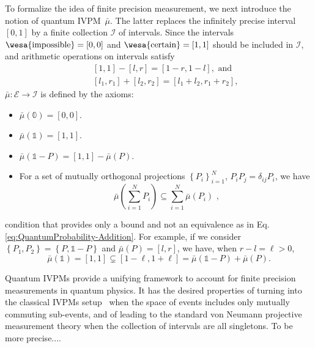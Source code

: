 \documentclass[english,reprint, aps, prl,superscriptaddress, showpacs,
showkeys, longbibliography]{revtex4-1}
\theoremstyle{plain}
\theoremstyle{definition}
\newcommand{\events}{\ensuremath{\mathcal{E}}}
\newcommand{\imposs}{{\mbox{\wesa{impossible}}}}
\newcommand{\necess}{{\mbox{\wesa{certain}}}}
\begin{document}
To formalize the idea of finite precision measurement, we next introduce 
the notion of quantum IVPM~$\bar{\mu}$. The latter replaces 
the infinitely precise interval $[0,1]$ by a finite collection $\mathscr{I}$ of
intervals. Since the intervals $\imposs=\left[0,0\right]$ and $\necess=\left[1,1\right]$ 
should be included in $\mathscr{I}$, and arithmetic operations on intervals satisfy
\begin{subequations}\label{eq:interval-operations}
\begin{eqnarray}
 &  & \left[1,1\right]-\left[l,r\right]=\left[1-r,1-l\right], \textrm{ and}\\
 &  & [l_{1},r_{1}]+[l_{2},r_{2}]=[l_{1}+l_{2},r_{1}+r_{2}] ,
\end{eqnarray}
\end{subequations}
$\bar{\mu}:\events\rightarrow\mathscr{I}$ is defined by the axioms:
\begin{itemize}
\item $\bar{\mu}(\mathbb{0})=\left[0,0\right]$. 
\item $\bar{\mu}(\mathbb{1})=\left[1,1\right]$. 
\item $\bar{\mu}\left(\mathbb{1}-P\right)=\left[1,1\right]-\bar{\mu}\left(P\right)$. 
\item For a set of mutually orthogonal projections $\left\{ P_{i}\right\} _{i=1}^{N}$,
$P_{i}P_{j}=\delta_{ij}P_{i}$, we have 
\begin{equation}
\bar{\mu}\left(\sum_{i=1}^{N}P_{i}\right)\subseteq\sum_{i=1}^{N}\bar{\mu}\left(P_{i}\right)\textrm{ ,}\label{eq:QuantumInterval-valuedProbability-Inclusion}
\end{equation}
\end{itemize}
condition that provides only a bound and not an equivalence as in Eq. 
\eqref{eq:QuantumProbability-Addition}. For
example, if we consider $\left\{ P_{1},P_{2}\right\} =\left\{ P,\mathbb{1}-P\right\} $
and $\bar{\mu}\left(P\right)=\left[l,r\right]$, we have, when $r-l=\ell>0$,
\[
\bar{\mu}(\mathbb{1})=\left[1,1\right]\subsetneq\left[1-\ell,1+\ell\right]=
\bar{\mu}\left(\mathbb{1}-P\right)+\bar{\mu}\left(P\right) .
\]

Quantum IVPMs provide a unifying framework to account for 
finite precision measurements in quantum physics. It has the desired 
properties of turning into the classical IVPMs setup~\cite{JamisonLodwick2004}
when the space of events includes only mutually commuting sub-events, and 
of leading to the standard von Neumann projective measurement theory when 
the collection of intervals are all singletons. To be more precise....
\end{document}

